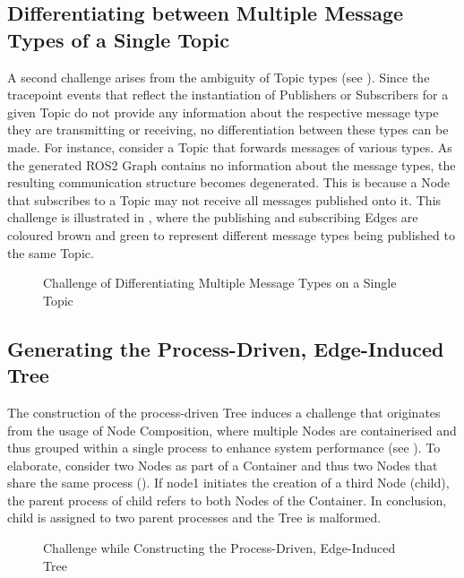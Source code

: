     \subsection{Differentiating between Multiple Message Types of a Single Topic}
        A second challenge arises from the ambiguity of Topic types (see ). Since the tracepoint events that reflect the instantiation of Publishers or Subscribers for a given Topic do not provide any information about the respective message type they are transmitting or receiving, no differentiation between these types can be made.\newline
        For instance, consider a Topic that forwards messages of various types. As the generated ROS2 Graph contains no information about the message types, the resulting communication structure becomes degenerated. This is because a Node that subscribes to a Topic may not receive all messages published onto it. This challenge is illustrated in , where the publishing and subscribing Edges are coloured brown and green to represent different message types being published to the same Topic.
        \begin{figure}[h]
            \centering
            
            \caption[Challenge of Differentiating Multiple Message Types on a Single Topic]{Challenge of Differentiating Multiple Message Types on a Single Topic \circledLegendadapted} \label{fig:tikz:topicProblem}
        \end{figure}


    \subsection{Generating the Process-Driven, Edge-Induced Tree}
        The construction of the process-driven Tree induces a challenge that originates from the usage of Node Composition, where multiple Nodes are containerised and thus grouped within a single process to enhance system performance (see ). To elaborate, consider two Nodes as part of a Container and thus two Nodes that share the same process (). If \glqq{}node1\grqq{} initiates the creation of a third Node (\glqq{}child\grqq{}), the parent process of \glqq{}child\grqq{} refers to both Nodes of the Container. In conclusion, \glqq{}child\grqq{} is assigned to two parent processes and the Tree is malformed.
        \begin{figure}[h]
            \centering
            
            \caption[Challenge while Constructing the Process-Driven, Edge-Induced Tree]{Challenge while Constructing the Process-Driven, Edge-Induced Tree \circledLegendadapted} \label{fig:tikz:processProblem}
        \end{figure}


